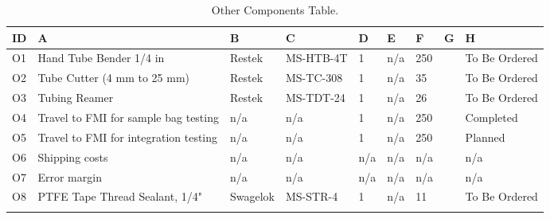 \begin{longtable} {|m{}|m{}|m{}|m{}|m{}|m{}|m{}|m{}|m{}|} \hline \textbf{ID} & \textbf{A} & \textbf{B} & \textbf{C} & \textbf{D} & \textbf{E} & \textbf{F}  & \textbf{G}  & \textbf{H} \\ \hline O1 & Hand Tube Bender 1/4 in & Restek & MS-HTB-4T & 1 & n/a & 250 &  & To Be Ordered \\ \hline O2 & Tube Cutter (4 mm to 25 mm) & Restek & MS-TC-308 & 1 & n/a & 35 &  & To Be Ordered \\ \hline O3 & Tubing Reamer & Restek & MS-TDT-24 & 1 & n/a & 26 &  & To Be Ordered \\ \hline O4 & Travel to FMI for sample bag testing & n/a & n/a & 1 & n/a & 250 &  & Completed \\ \hline O5 & Travel to FMI for integration testing & n/a & n/a & 1 & n/a & 250 &  & Planned \\ \hline O6 & Shipping costs & n/a & n/a & n/a & n/a & n/a &  & n/a \\ \hline O7 & Error margin & n/a & n/a & n/a & n/a & n/a &  & n/a \\ \hline O8 & PTFE Tape Thread Sealant, 1/4" & Swagelok & MS-STR-4 & 1 & n/a & 11 &  & To Be Ordered \\ \hline \caption{Other Components Table.} \label{tab:component-table-other} \end{longtable} \raggedbottom